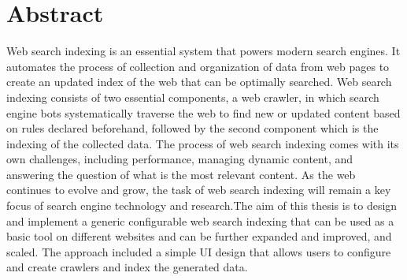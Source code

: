 \chapter*{Abstract}
Web search indexing is an essential system that powers modern search engines. It automates the process of collection and organization of data from web pages to create an updated index of the web that can be optimally searched. Web search indexing consists of two essential components, a web crawler, in which search engine bots systematically traverse the web to find new or updated content based on rules declared beforehand, followed by the second component which is the indexing of the collected data. The process of web search indexing comes with its own challenges, including performance, managing dynamic content, and answering the question of what is the most relevant content. As the web continues to evolve and grow, the task of web search indexing will remain a key focus of search engine technology and research.The aim of this thesis is to design and implement a generic configurable web search indexing that can be used as a basic tool on different websites and can be further expanded and improved, and scaled.  The approach included a simple UI design that allows users to configure and create crawlers and index the generated data. 